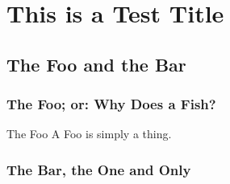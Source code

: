 \documentclass[a4paper]{book}
\begin{document}
\setcounter{chapter}{2}
\chapter{This is a Test Title}
\section{The Foo and the Bar}
\subsection{The Foo; or: Why Does a Fish?}
\Blindtext
\begin{definition}{The Foo}{}
	A Foo is simply a thing.
\end{definition}
\subsection{The Bar, the One and Only}
\blindtext[2]
\end{document}
